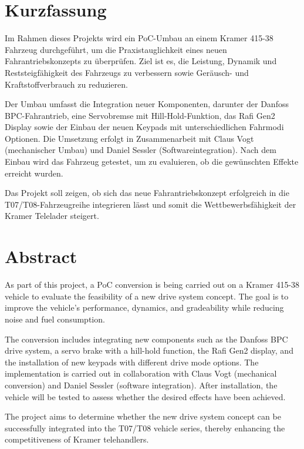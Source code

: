 \documentclass[a4paper, 12pt]{article} %
\begin{document}
\rmfamily

\clearpage

\section*{Kurzfassung}
\begin{spacing}{1.8}  %
    \fontsize{14pt}{14pt}\selectfont  %
    Im Rahmen dieses Projekts wird ein \acf{PoC}-Umbau an einem Kramer 415-38 Fahrzeug durchgeführt, 
    um die Praxistauglichkeit eines neuen Fahrantriebskonzepts zu überprüfen. Ziel ist es, die Leistung, 
    Dynamik und Reststeigfähigkeit des Fahrzeugs zu verbessern sowie Geräusch- und Kraftstoffverbrauch zu reduzieren.

    Der Umbau umfasst die Integration neuer Komponenten, darunter der Danfoss \ac{BPC}-Fahrantrieb, 
    eine Servobremse mit Hill-Hold-Funktion, das Rafi Gen2 Display sowie der Einbau der neuen Keypads 
    mit unterschiedlichen Fahrmodi Optionen. Die Umsetzung erfolgt in Zusammenarbeit mit Claus Vogt (mechanischer Umbau) und 
    Daniel Sessler (Softwareintegration). Nach dem Einbau wird das Fahrzeug getestet, um zu evaluieren, ob die gewünschten Effekte erreicht wurden.
    
    Das Projekt soll zeigen, ob sich das neue Fahrantriebskonzept erfolgreich in die T07/T08-Fahrzeugreihe integrieren lässt und somit die Wettbewerbsfähigkeit der Kramer Telelader steigert.
\end{spacing}

\clearpage
\section*{Abstract}
\begin{spacing}{1.8}  %
    \fontsize{14pt}{14pt}\selectfont  %
    As part of this project, a \acf{PoC} conversion is being carried out on a Kramer 415-38 
    vehicle to evaluate the feasibility of a new drive system concept. The goal is to 
    improve the vehicle's performance, dynamics, and gradeability while reducing noise and fuel consumption.

    The conversion includes integrating new components such as the Danfoss \ac{BPC} drive system, 
    a servo brake with a hill-hold function, the Rafi Gen2 display, and the installation of new 
    keypads with different drive mode options. The implementation is carried out in collaboration with Claus Vogt 
    (mechanical conversion) and Daniel Sessler (software integration). After installation, the vehicle 
    will be tested to assess whether the desired effects have been achieved.
    
    The project aims to determine whether the new drive system concept can be successfully 
    integrated into the T07/T08 vehicle series, thereby enhancing the competitiveness of Kramer telehandlers.

\end{spacing}
\clearpage
\end{document}
